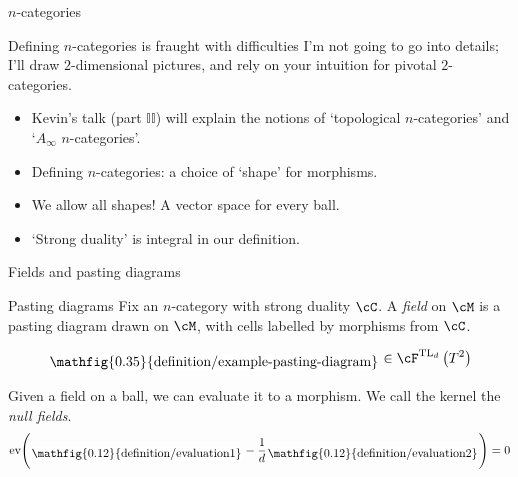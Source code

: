 \documentclass[beamer]{beamer}
\begin{document}
\begin{frame}{$n$-categories}
\begin{block}{Defining $n$-categories is fraught with difficulties}
I'm not going to go into details; I'll draw $2$-dimensional pictures, and rely on your intuition for pivotal $2$-categories.
\end{block}
\begin{block}{}
\begin{itemize}
\item
Kevin's talk (part $\mathbb{II}$) will explain the notions of `topological $n$-categories' and `$A_\infty$ $n$-categories'.\item
Defining $n$-categories: a choice of `shape' for morphisms.
\item
We allow all shapes! A vector space for every ball.
\item
`Strong duality' is integral in our definition.
\end{itemize}
\end{block}
\end{frame}

\newcommand{\roundframe}[1]{\begin{tikzpicture}[baseline]\node[rectangle,inner sep=1pt,rounded corners,fill=white] {#1};\end{tikzpicture}}


\begin{frame}{Fields and pasting diagrams}
\begin{block}{Pasting diagrams}
Fix an $n$-category with strong duality $\cC$. A \emph{field} on $\cM$ is a pasting diagram drawn on $\cM$, with cells labelled by morphisms from $\cC$.
\end{block}
\begin{example}[$\cC = \text{TL}_d$ the Temperley-Lieb category]
$$\roundframe{\mathfig{0.35}{definition/example-pasting-diagram}} \in \cF^{\text{TL}_d}\left(T^2\right)$$
\end{example}
\begin{block}{}
Given a field on a ball, we can evaluate it to a morphism. We call the kernel the \emph{null fields}.
\vspace{-3mm}
$$\text{ev}\Bigg(\roundframe{\mathfig{0.12}{definition/evaluation1}} - \frac{1}{d}\roundframe{\mathfig{0.12}{definition/evaluation2}}\Bigg) = 0$$
\end{block}
\end{frame}
\end{document}
